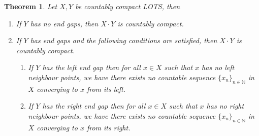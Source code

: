 \documentclass[12pt,oneside,english]{amsbook}
\numberwithin{equation}{section} %
\numberwithin{figure}{section} %
\theoremstyle{plain}
\numberwithin{section}{chapter}
\newtheorem{thm}{Theorem}[section]
\theoremstyle{plain}
\begin{document}
\begin{thm}\label{lp:thm:7}
  Let $X,Y$ be countably compact LOTS, then
  \begin{enumerate}
  \item If $Y$ has no end gaps, then $X \cdot Y$ is countably compact.
  \item If $Y$ has end gaps and the following conditions are satisfied, then $X \cdot Y$ is countably compact.
    \begin{enumerate}
    \item If $Y$ has the left end gap then for all $x  \in  X$ such that $x$ has no left neighbour points, we have there exists no countable sequence $\{x_{n}\}_{n \in \mathbb{N}}$ in $X$ converging to $x$ from its left.
    \item If $Y$ has the right end gap then for all $x  \in  X$ such that $x$ has no right neighbour points, we have there exists no countable sequence $\{x_{n}\}_{n \in \mathbb{N}}$ in $X$ converging to $x$ from its right.
    \end{enumerate}
  \end{enumerate}
\end{thm}
\end{document}
